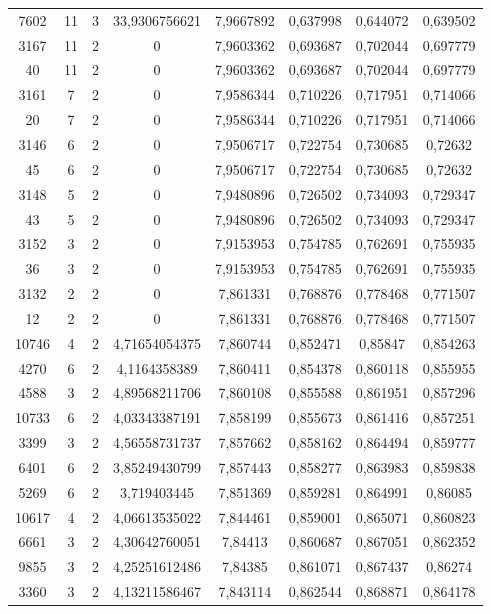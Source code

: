 \begin{longtable}{|c|c|c|c|c|c|c|c|}
7602 & 11 & 3 & 33,9306756621 & 7,9667892 & 0,637998 & 0,644072 & 0,639502 \\
3167 & 11 & 2 & 0 & 7,9603362 & 0,693687 & 0,702044 & 0,697779 \\
40 & 11 & 2 & 0 & 7,9603362 & 0,693687 & 0,702044 & 0,697779 \\
3161 & 7 & 2 & 0 & 7,9586344 & 0,710226 & 0,717951 & 0,714066 \\
20 & 7 & 2 & 0 & 7,9586344 & 0,710226 & 0,717951 & 0,714066 \\
3146 & 6 & 2 & 0 & 7,9506717 & 0,722754 & 0,730685 & 0,72632 \\
45 & 6 & 2 & 0 & 7,9506717 & 0,722754 & 0,730685 & 0,72632 \\
3148 & 5 & 2 & 0 & 7,9480896 & 0,726502 & 0,734093 & 0,729347 \\
43 & 5 & 2 & 0 & 7,9480896 & 0,726502 & 0,734093 & 0,729347 \\
3152 & 3 & 2 & 0 & 7,9153953 & 0,754785 & 0,762691 & 0,755935 \\
36 & 3 & 2 & 0 & 7,9153953 & 0,754785 & 0,762691 & 0,755935 \\
3132 & 2 & 2 & 0 & 7,861331 & 0,768876 & 0,778468 & 0,771507 \\
12 & 2 & 2 & 0 & 7,861331 & 0,768876 & 0,778468 & 0,771507 \\
10746 & 4 & 2 & 4,71654054375 & 7,860744 & 0,852471 & 0,85847 & 0,854263 \\
4270 & 6 & 2 & 4,1164358389 & 7,860411 & 0,854378 & 0,860118 & 0,855955 \\
4588 & 3 & 2 & 4,89568211706 & 7,860108 & 0,855588 & 0,861951 & 0,857296 \\
10733 & 6 & 2 & 4,03343387191 & 7,858199 & 0,855673 & 0,861416 & 0,857251 \\
3399 & 3 & 2 & 4,56558731737 & 7,857662 & 0,858162 & 0,864494 & 0,859777 \\
6401 & 6 & 2 & 3,85249430799 & 7,857443 & 0,858277 & 0,863983 & 0,859838 \\
5269 & 6 & 2 & 3,719403445 & 7,851369 & 0,859281 & 0,864991 & 0,86085 \\
10617 & 4 & 2 & 4,06613535022 & 7,844461 & 0,859001 & 0,865071 & 0,860823 \\
6661 & 3 & 2 & 4,30642760051 & 7,84413 & 0,860687 & 0,867051 & 0,862352 \\
9855 & 3 & 2 & 4,25251612486 & 7,84385 & 0,861071 & 0,867437 & 0,86274 \\
3360 & 3 & 2 & 4,13211586467 & 7,843114 & 0,862544 & 0,868871 & 0,864178 \\

\end{longtable}
